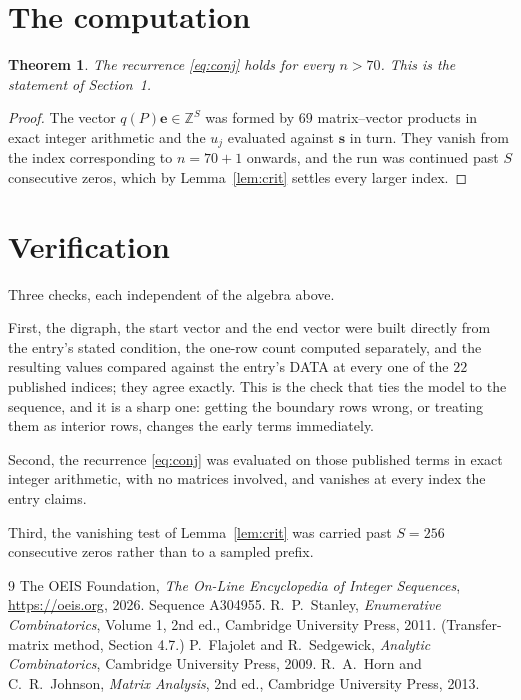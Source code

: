 \documentclass[11pt,a4paper]{article}
\theoremstyle{plain}
\newtheorem{theorem}{Theorem}
\theoremstyle{definition}
\begin{document}
\section{The computation}

\begin{theorem}
The recurrence \eqref{eq:conj} holds for every $n>70$. This is the statement of
Section~1.
\end{theorem}

\begin{proof}
The vector $q(P)\mathbf{e}\in\mathbb{Z}^{S}$ was formed by $69$ matrix--vector
products in exact integer arithmetic and the $u_j$ evaluated against $\mathbf{s}$ in turn.
They vanish from the index corresponding to $n=70+1$ onwards, and the run was continued
past $S$ consecutive zeros, which by Lemma~\ref{lem:crit} settles every larger index.
\end{proof}

\section{Verification}

Three checks, each independent of the algebra above.

First, the digraph, the start vector and the end vector were built directly from the
entry's stated condition, the one-row count computed separately, and the resulting values
compared against the entry's DATA at every one of the $22$ published indices; they
agree exactly. This is the check that ties the model to the sequence, and it is a sharp one:
getting the boundary rows wrong, or treating them as interior rows, changes the early terms
immediately.

Second, the recurrence \eqref{eq:conj} was evaluated on those published terms in exact
integer arithmetic, with no matrices involved, and vanishes at every index the entry claims.

Third, the vanishing test of Lemma~\ref{lem:crit} was carried past $S=256$ consecutive
zeros rather than to a sampled prefix.

\begin{thebibliography}{9}
 The OEIS Foundation, \emph{The On-Line Encyclopedia of Integer
Sequences}, \url{https://oeis.org}, 2026. Sequence A304955.
 R.~P.~Stanley, \emph{Enumerative Combinatorics}, Volume 1, 2nd ed.,
Cambridge University Press, 2011. (Transfer-matrix method, Section 4.7.)
 P.~Flajolet and R.~Sedgewick, \emph{Analytic Combinatorics}, Cambridge
University Press, 2009.
 R.~A.~Horn and C.~R.~Johnson, \emph{Matrix Analysis}, 2nd ed., Cambridge
University Press, 2013.
\end{thebibliography}
\end{document}
